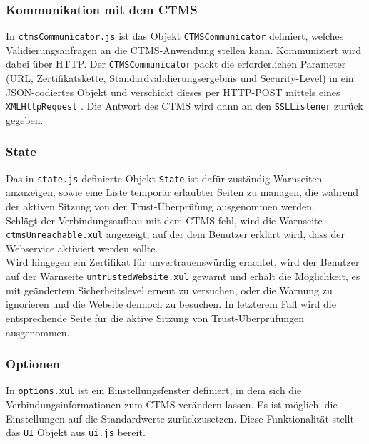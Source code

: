 \documentclass[accentcolor=tud1c,article,colorback,11pt]{tudreport}
\begin{document}
\subsubsection{Kommunikation mit dem CTMS}
In \texttt{ctmsCommunicator.js} ist das Objekt \texttt{CTMSCommunicator} definiert, welches Validierungsanfragen an die CTMS-Anwendung stellen kann. Kommuniziert wird dabei über HTTP. Der \texttt{CTMSCommunicator} packt die erforderlichen Parameter (URL, Zertifikatskette, Standardvalidierungsergebnis und Security-Level) in ein JSON-codiertes Objekt und verschickt dieses per HTTP-POST mittels eines \texttt{XMLHttpRequest} \cite{httpRequest}. Die Antwort des CTMS wird dann an den \texttt{SSLListener} zurück gegeben.

\subsubsection{State}
Das in \texttt{state.js} definierte Objekt \texttt{State} ist dafür zuständig Warnseiten anzuzeigen, sowie eine Liste temporär erlaubter Seiten zu managen, die während der aktiven Sitzung von der Trust-Überprüfung ausgenommen werden.\\
Schlägt der Verbindungsaufbau mit dem CTMS fehl, wird die Warnseite \texttt{ctmsUnreachable.xul} angezeigt, auf der dem Benutzer erklärt wird, dass der Webservice aktiviert werden sollte.\\
Wird hingegen ein Zertifikat für unvertrauenswürdig erachtet, wird der Benutzer auf der Warnseite \texttt{untrustedWebsite.xul} gewarnt und erhält die Möglichkeit, es mit geändertem Sicherheitslevel erneut zu versuchen, oder die Warnung zu ignorieren und die Website dennoch zu besuchen. In letzterem Fall wird die entsprechende Seite für die aktive Sitzung von Trust-Überprüfungen ausgenommen.

\subsubsection{Optionen} 
In \texttt{options.xul} ist ein Einstellungsfenster definiert, in dem sich die Verbindungsinformationen zum CTMS verändern lassen. Es ist möglich, die Einstellungen auf die Standardwerte zurückzusetzen. Diese Funktionalität stellt das \texttt{UI} Objekt aus \texttt{ui.js} bereit.

\newpage


\end{document}
